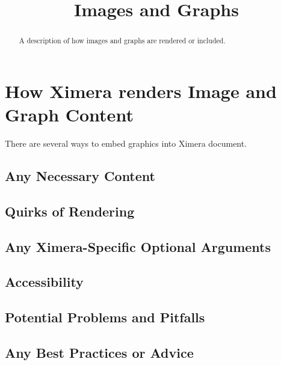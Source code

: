 \documentclass{ximera}
\title{Images and Graphs}
\begin{document}
\begin{abstract}
    A description of how images and graphs are rendered or included.
\end{abstract}
\maketitle
   
\section*{How Ximera renders Image and Graph Content}

There are several ways to embed graphics into Ximera document. 

\begin{center}
\end{center}

\begin{center}
\end{center}


    \subsection*{Any Necessary Content}
    
    
    
    \subsection*{Quirks of Rendering}
    
    
    
    \subsection*{Any Ximera-Specific Optional Arguments}
    
    
    
    \subsection*{Accessibility}
    
    
    
    \subsection*{Potential Problems and Pitfalls}
    
    
    
    \subsection*{Any Best Practices or Advice}
    
    

    
\end{document}
